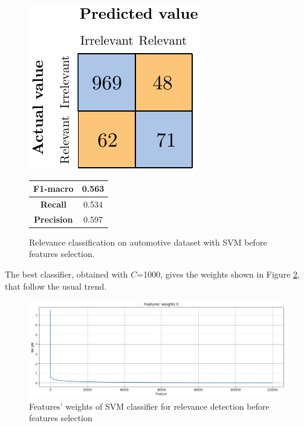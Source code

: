 \begin{figure}[H]
	\begin{minipage}[b]{0.6\linewidth}
		\centering
		\includegraphics[scale=1]{figures/conf_matrices/ita_rel_svm/ita_rel_svm_bfs.pdf}
	\end{minipage}
	\begin{minipage}[b]{0.3\linewidth}
		\begin{tabular}[b]{ | c | c | } 
			\hline
			\textbf{F1-macro} & 0.563 \\
			\hline
			\textbf{Recall} & 0.534 \\ 
			\hline
			\textbf{Precision} & 0.597 \\ 
			\hline
		\end{tabular}
	\end{minipage}
	\caption{Relevance classification on automotive dataset with SVM before features selection.}
	\label{fig:ita_rel_svm_bfs}
\end{figure}


The best classifier, obtained with $C$=1000, gives the weights shown in Figure \ref{fig:ita_rel_svm_fs}, that follow the usual trend.

\begin{figure}[H]
	\centering
	\includegraphics[width=\textwidth]{figures/conf_matrices/ita_rel_svm/ita_rel_svm_fs.png}
	\caption{Features' weights of SVM classifier for relevance detection before features selection}
	\label{fig:ita_rel_svm_fs}
\end{figure}

